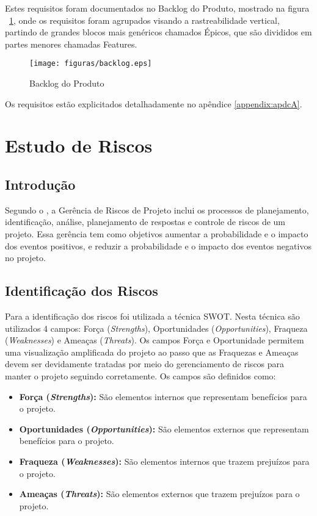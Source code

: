 Estes requisitos foram documentados no Backlog do Produto, mostrado na figura ~\ref{fig:backlog}, onde os requisitos foram agrupados visando a rastreabilidade vertical, partindo de grandes blocos mais genéricos chamados Épicos, que são divididos em partes menores chamadas Features.

\begin{figure}[!h]
  \centering
  	\texttt{[image: figuras/backlog.eps]}
   \caption{Backlog do Produto\label{fig:backlog}}
\end{figure}

Os requisitos estão explicitados detalhadamente no apêndice \ref{appendix:apdcA}.

\chapter{Estudo de Riscos}
\section{Introdução}
Segundo o \cite{pmbok}, a Gerência de Riscos de Projeto inclui os processos de planejamento, identificação,
análise, planejamento de respostas e controle de riscos de um projeto. Essa gerência tem como objetivos aumentar a
probabilidade e o impacto dos eventos positivos, e reduzir a probabilidade e o impacto dos eventos negativos no projeto.

\section{Identificação dos Riscos}
Para a identificação dos riscos foi utilizada a técnica SWOT. Nesta técnica são utilizados 4 campos: Força (\textit{Strengths}),
 Oportunidades (\textit{Opportunities}), Fraqueza (\textit{Weaknesses}) e Ameaças (\textit{Threats}). Os campos Força e Oportunidade permitem uma
 visualização amplificada do projeto ao passo que as Fraquezas e Ameaças devem ser devidamente tratadas por meio do
 gerenciamento de riscos para manter o projeto seguindo corretamente. Os campos são definidos como:

\begin{itemize}
  \item \textbf{Força (\textit{Strengths}):} São elementos internos que representam benefícios para o projeto.
  \item \textbf{Oportunidades (\textit{Opportunities}):} São elementos externos que representam benefícios para o projeto.
  \item \textbf{Fraqueza (\textit{Weaknesses}):} São elementos internos que trazem prejuízos para o projeto.
  \item \textbf{Ameaças (\textit{Threats}):} São elementos externos que trazem prejuízos para o projeto.
\end{itemize}

